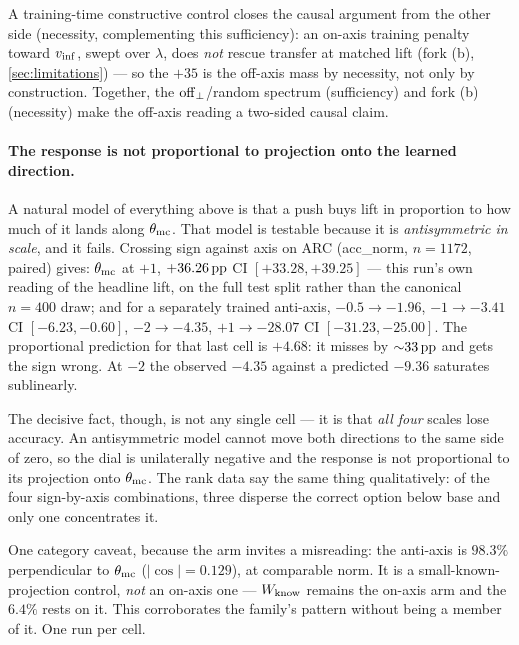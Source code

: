 A training-time constructive control closes the causal argument from the other side
(necessity, complementing this sufficiency): an on-axis training penalty toward
$v_{\mathrm{inf}}$, swept over $\lambda$, does \emph{not} rescue transfer at matched lift
(fork (b), \cref{sec:limitations}) --- so the $+35$ is the off-axis mass by necessity, not
only by construction. Together, the $\mathrm{off}_{\perp}$/random spectrum (sufficiency) and
fork (b) (necessity) make the off-axis reading a two-sided causal claim.

\paragraph{The response is not proportional to projection onto the learned
direction.} A natural model of everything above is that a push buys lift in
proportion to how much of it lands along $\theta_{\mathrm{mc}}$. That model is testable because
it is \emph{antisymmetric in scale}, and it fails. Crossing sign against axis on ARC
(acc\_norm, $n{=}1172$, paired) gives: $\theta_{\mathrm{mc}}$ at $+1$, $+36.26\,\mathrm{pp}$ CI
$[+33.28, +39.25]$ --- this run's own reading of the headline lift, on the full test
split rather than the canonical $n{=}400$ draw; and for a separately trained
anti-axis, $-0.5 \rightarrow -1.96$,
$-1 \rightarrow -3.41$ CI $[-6.23, -0.60]$, $-2 \rightarrow -4.35$, $+1 \rightarrow
\mathbf{-28.07}$ CI $[-31.23, -25.00]$. The proportional prediction for that last
cell is $+4.68$: it misses by ${\sim}33\,\mathrm{pp}$ and gets the sign wrong. At $-2$ the
observed $-4.35$ against a predicted $-9.36$ saturates sublinearly.

The decisive fact, though, is not any single cell --- it is that \emph{all four}
scales lose accuracy. An antisymmetric model cannot move both directions to the same
side of zero, so the dial is unilaterally negative and the response is not
proportional to its projection onto $\theta_{\mathrm{mc}}$. The rank data say the same thing
qualitatively: of
the four sign-by-axis combinations, three disperse the correct option below base and
only one concentrates it.

One category caveat, because the arm invites a misreading: the anti-axis is
$98.3\%$ perpendicular to $\theta_{\mathrm{mc}}$ ($|\cos| = 0.129$), at comparable norm. It is a
small-known-projection control, \emph{not} an on-axis one --- $W_{\mathrm{know}}$ remains the
on-axis arm and the $6.4\%$ rests on it. This corroborates the family's pattern
without being a member of it. One run per cell.

